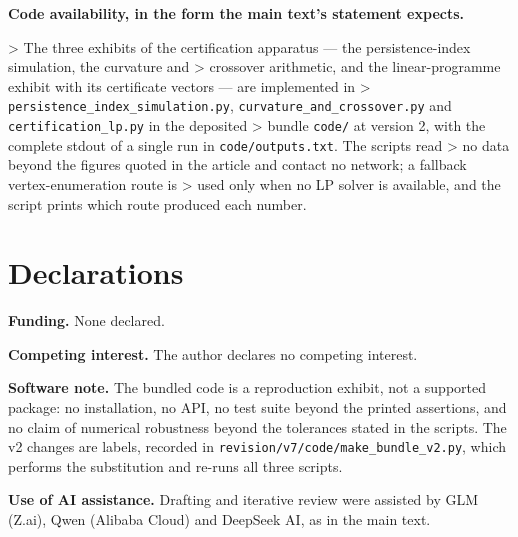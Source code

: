 \documentclass[11pt]{article}
\begin{document}
\textbf{Code availability, in the form the main text's statement expects.}

> The three exhibits of the certification apparatus --- the persistence-index simulation, the curvature and > crossover arithmetic, and the linear-programme exhibit with its certificate vectors --- are implemented in > \texttt{persistence\_index\_simulation.py}, \texttt{curvature\_and\_crossover.py} and \texttt{certification\_lp.py} in the deposited > bundle \texttt{code/} at version 2, with the complete stdout of a single run in \texttt{code/outputs.txt}. The scripts read > no data beyond the figures quoted in the article and contact no network; a fallback vertex-enumeration route is > used only when no LP solver is available, and the script prints which route produced each number.

\vspace{0.8em}

\section*{Declarations}\label{declarations}

\textbf{Funding.} None declared.

\textbf{Competing interest.} The author declares no competing interest.

\textbf{Software note.} The bundled code is a reproduction exhibit, not a supported package: no installation, no API, no test suite beyond the printed assertions, and no claim of numerical robustness beyond the tolerances stated in the scripts. The v2 changes are labels, recorded in \texttt{revision/v7/code/make\_bundle\_v2.py}, which performs the substitution and re-runs all three scripts.

\textbf{Use of AI assistance.} Drafting and iterative review were assisted by GLM (Z.ai), Qwen (Alibaba Cloud) and DeepSeek AI, as in the main text.
\end{document}

